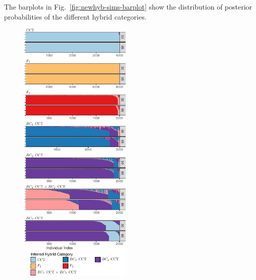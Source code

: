{The barplots in Fig.~\ref{fig:newhyb-sims-barplot} show the distribution of posterior
probabilities of the different hybrid categories. 
\begin{figure}
\newcommand{\nhbpcap}{\footnotesize Posterior probabilities for simulated
individuals of different trout hybrid categories.  Each pair of plots shows the results
for individuals of the true hybrid category listed atop the pair  (see
 Table~\protect\ref{tab:newhybcats} for the meanings of the names).  The top panel of each pair
shows results for fish simulated with the 30 markers used by \protect\citet{rizza2023limited}, and the bottom panel shows results for fish simulated with the original 30 markers,
plus an additional  35 (65 total), some of which are linked
on the same chromosome. Each individual appears as a thin vertical line, posterior probabilities of
each inferred hybrid category are indicated by extent of different colors on those lines.  Individuals
are sorted according to maximum {\em a posteriori} hybrid category, and, within that by the
maximum posterior probability. }
\begin{center}
\includegraphics[width=0.48\textwidth]{figures/newhybs-texed-crop.pdf}

\end{center}
\end{figure}}
